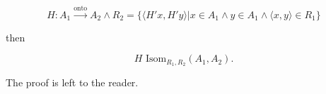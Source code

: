 $$H: A_1 \xrightarrow{\text{onto}} A_2 \wedge R_2 = \{ \langle H'x, H'y \rangle | x \in A_1 \wedge y \in A_1 \wedge \langle x, y \rangle \in R_1 \}$$

then

$$H \text{ Isom}_{R_1, R_2}(A_1, A_2).$$

The proof is left to the reader.
